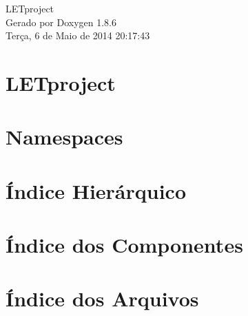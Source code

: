 \documentclass[twoside]{book}
\newcommand{\clearemptydoublepage}{%
  \newpage{\pagestyle{empty}\cleardoublepage}%
}
\begin{document}
\hypersetup{pageanchor=false}
\begin{titlepage}
\vspace*{7cm}
\begin{center}%
{\Large L\-E\-Tproject }\\
\vspace*{1cm}
{\large Gerado por Doxygen 1.8.6}\\
\vspace*{0.5cm}
{\small Terça, 6 de Maio de 2014 20:17:43}\\
\end{center}
\end{titlepage}
\clearemptydoublepage
\tableofcontents
\clearemptydoublepage
{}
\hypersetup{pageanchor=true}

\chapter{L\-E\-Tproject}
\label{d0/d30/md_README}
\hypertarget{d0/d30/md_README}{}

\chapter{Namespaces}

\chapter{Índice Hierárquico}

\chapter{Índice dos Componentes}

\chapter{Índice dos Arquivos}

\end{document}

